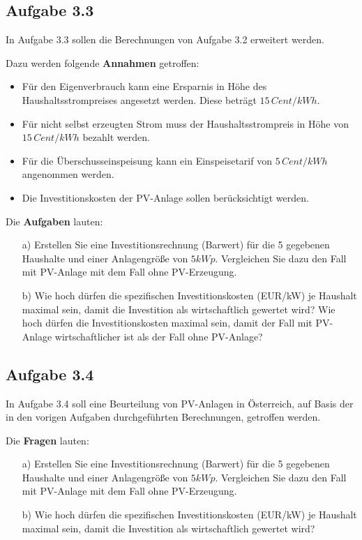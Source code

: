 \documentclass[a4paper,12pt]{article}
\begin{document}
	\subsection{Aufgabe 3.3}
	In Aufgabe 3.3 sollen die Berechnungen von Aufgabe 3.2 erweitert werden.\\ \par
	\noindent Dazu werden folgende \textbf{Annahmen} getroffen:
	\begin{itemize}
		\item Für den Eigenverbrauch kann eine Ersparnis in Höhe des Haushaltsstrompreises angesetzt werden. Diese beträgt $15\,Cent/kWh$.
		\item Für nicht selbst erzeugten Strom muss der Haushaltsstrompreis in Höhe von $15\,Cent/kWh$ bezahlt werden.
		\item Für die Überschusseinspeisung kann ein Einspeisetarif von $5\,Cent/kWh$ angenommen werden.
		\item Die Investitionskosten der PV-Anlage sollen berücksichtigt werden.
	\end{itemize}
	Die \textbf{Aufgaben} lauten:
	\begin{itemize}
		\item[a)] Erstellen Sie eine Investitionsrechnung (Barwert) für die 5 gegebenen Haushalte und einer Anlagengröße von $5kWp$. Vergleichen Sie dazu den Fall mit PV-Anlage mit dem Fall ohne PV-Erzeugung.
		\item[b)] Wie hoch dürfen die spezifischen Investitionskosten (EUR/kW) je Haushalt maximal sein, damit die Investition als wirtschaftlich gewertet wird? Wie hoch dürfen die Investitionskosten maximal sein, damit der Fall mit PV-Anlage wirtschaftlicher ist als der Fall ohne PV-Anlage?
	\end{itemize}
	\subsection{Aufgabe 3.4}
	In Aufgabe 3.4 soll eine Beurteilung von PV-Anlagen in Österreich, auf Basis der in den vorigen Aufgaben durchgeführten Berechnungen, getroffen werden.\\ \par
	\noindent Die \textbf{Fragen} lauten:
	\begin{itemize}
		\item[a)] Erstellen Sie eine Investitionsrechnung (Barwert) für die 5 gegebenen Haushalte und einer Anlagengröße von $5kWp$. Vergleichen Sie dazu den Fall mit PV-Anlage mit dem Fall ohne PV-Erzeugung.
		\item[b)] Wie hoch dürfen die spezifischen Investitionskosten (EUR/kW) je Haushalt maximal sein, damit die Investition als wirtschaftlich gewertet wird?
	\end{itemize}
	\newpage
\end{document}
